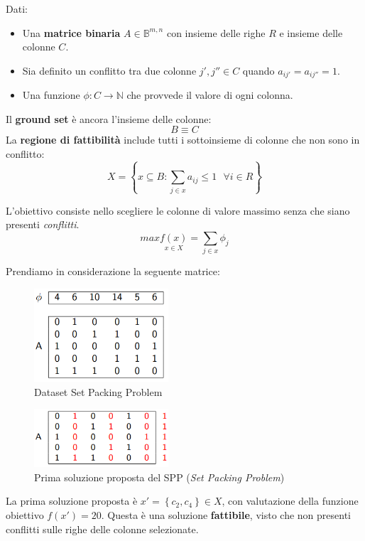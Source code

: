 \documentclass{article}
\begin{document}
Dati:
\begin{itemize}
    \item Una \textbf{matrice binaria} $A\in \mathbb{B}^{m,n}$ con insieme delle righe $R$ e insieme delle colonne $C$.
    \item Sia definito un conflitto tra due colonne $j',j'' \in C$ quando $a_{ij'}=a_{ij''}=1$.
    \item Una funzione $\phi:C\rightarrow \mathbb{N}$ che provvede il valore di ogni colonna.
\end{itemize}
Il \textbf{ground set} è ancora l'insieme delle colonne:
$$B\equiv C$$
La \textbf{regione di fattibilità} include tutti i sottoinsieme di colonne che non sono in conflitto:
$$X=\left\{x\subseteq B:\sum_{j\in x}a_{ij}\leq 1 \text{ } \forall i \in R\right\}$$

L'obiettivo consiste nello scegliere le colonne di valore massimo senza che siano presenti \textit{conflitti}.
$$max\underset{x\in X}{f(x)}=\sum_{j \in x}\phi_j$$

Prendiamo in considerazione la seguente matrice:

\begin{figure}[H]
    \centering
    \includegraphics[width=5cm]{images/SPP_dataset.png}
    \caption{Dataset Set Packing Problem}
    \label{fig:datasets_SPP}
\end{figure}

\begin{figure}[H]
    \centering
    \includegraphics[width=5cm]{images/SPP_first_sol.png}
    \caption{Prima soluzione proposta del SPP (\textit{Set Packing Problem})}
    \label{fig:fst_sol_SPP}
\end{figure}


La prima soluzione proposta è $x'=\left\{c_2,c_4\right\}\in X$, con valutazione della funzione obiettivo
$f(x')=20$. Questa è una soluzione \textbf{fattibile}, visto che non presenti conflitti sulle righe delle colonne
selezionate.
\end{document}
